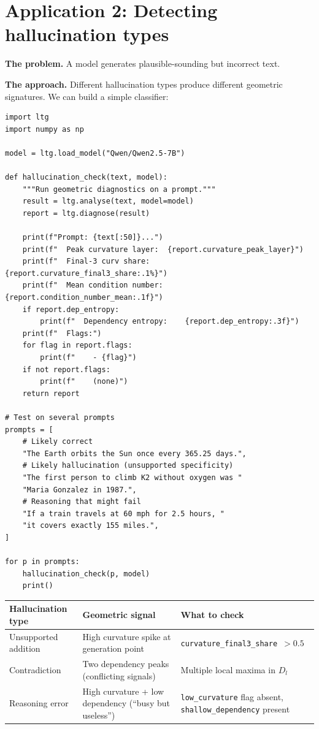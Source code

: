 \documentclass[11pt, twoside, openright]{memoir}
\begin{document}
\section{Application 2: Detecting hallucination types}

\textbf{The problem.} A model generates plausible-sounding but incorrect text.

\textbf{The approach.} Different hallucination types produce different
geometric signatures. We can build a simple classifier:

\begin{lstlisting}[caption={Geometric hallucination diagnostics}]
import ltg
import numpy as np

model = ltg.load_model("Qwen/Qwen2.5-7B")

def hallucination_check(text, model):
    """Run geometric diagnostics on a prompt."""
    result = ltg.analyse(text, model=model)
    report = ltg.diagnose(result)

    print(f"Prompt: {text[:50]}...")
    print(f"  Peak curvature layer:  {report.curvature_peak_layer}")
    print(f"  Final-3 curv share:    {report.curvature_final3_share:.1%}")
    print(f"  Mean condition number: {report.condition_number_mean:.1f}")
    if report.dep_entropy:
        print(f"  Dependency entropy:    {report.dep_entropy:.3f}")
    print(f"  Flags:")
    for flag in report.flags:
        print(f"    - {flag}")
    if not report.flags:
        print(f"    (none)")
    return report

# Test on several prompts
prompts = [
    # Likely correct
    "The Earth orbits the Sun once every 365.25 days.",
    # Likely hallucination (unsupported specificity)
    "The first person to climb K2 without oxygen was "
    "Maria Gonzalez in 1987.",
    # Reasoning that might fail
    "If a train travels at 60 mph for 2.5 hours, "
    "it covers exactly 155 miles.",
]

for p in prompts:
    hallucination_check(p, model)
    print()
\end{lstlisting}

\begin{center}
\renewcommand{\arraystretch}{1.4}\small
\begin{tabular}{@{}L{3cm} L{3.5cm} L{4cm}@{}}
\toprule
\textbf{Hallucination type} & \textbf{Geometric signal} & \textbf{What to check} \\
\midrule
Unsupported addition &
  High curvature spike at generation point &
  \texttt{curvature\_final3\_share $> 0.5$} \\
Contradiction &
  Two dependency peaks (conflicting signals) &
  Multiple local maxima in $D_l$ \\
Reasoning error &
  High curvature + low dependency (``busy but useless'') &
  \texttt{low\_curvature} flag absent, \texttt{shallow\_dependency} present \\
\bottomrule
\end{tabular}
\end{center}
\end{document}
